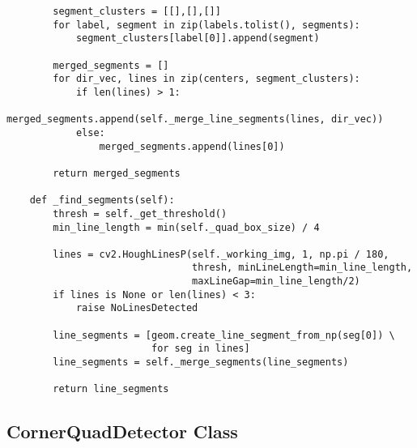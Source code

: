 \begin{verbatim}
        segment_clusters = [[],[],[]]
        for label, segment in zip(labels.tolist(), segments):
            segment_clusters[label[0]].append(segment)
        
        merged_segments = []
        for dir_vec, lines in zip(centers, segment_clusters):
            if len(lines) > 1:
                merged_segments.append(self._merge_line_segments(lines, dir_vec))
            else:
                merged_segments.append(lines[0])
        
        return merged_segments
    
    def _find_segments(self):
        thresh = self._get_threshold()
        min_line_length = min(self._quad_box_size) / 4
        
        lines = cv2.HoughLinesP(self._working_img, 1, np.pi / 180, 
                                thresh, minLineLength=min_line_length, 
                                maxLineGap=min_line_length/2)
        if lines is None or len(lines) < 3:
            raise NoLinesDetected
        
        line_segments = [geom.create_line_segment_from_np(seg[0]) \
                         for seg in lines]
        line_segments = self._merge_segments(line_segments)
        
        return line_segments
\end{verbatim}

\subsection{CornerQuadDetector Class}

